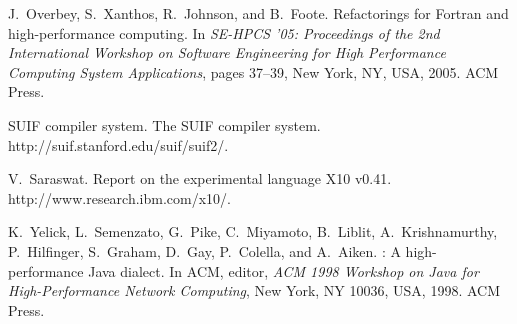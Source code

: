 \documentclass[natbib]{sigplanconf}
\begin{document}
\begin{thebibliography}{99}
J.~Overbey, S.~Xanthos, R.~Johnson, and B.~Foote.
\newblock Refactorings for {Fortran} and high-performance computing.
\newblock In {\em SE-HPCS '05: Proceedings of the 2nd International Workshop on
  Software Engineering for High Performance Computing System Applications},
  pages 37--39, New York, NY, USA, 2005. ACM Press.

{S}{U}{I}{F} compiler system.
\newblock The {S}{U}{I}{F} compiler system.
\newblock http://suif.stanford.edu/suif/suif2/.

V.~Saraswat.
\newblock Report on the experimental language {X10} v0.41.
\newblock http://www.research.ibm.com/x10/.

K.~Yelick, L.~Semenzato, G.~Pike, C.~Miyamoto, B.~Liblit, A.~Krishnamurthy,
  P.~Hilfinger, S.~Graham, D.~Gay, P.~Colella, and A.~Aiken.
: {A} high-performance {Java} dialect.
\newblock In {ACM}, editor, {\em {ACM} 1998 Workshop on Java for
  High-Performance Network Computing}, New York, NY 10036, USA, 1998. ACM
  Press.

\end{thebibliography}

%
%
\end{document}
